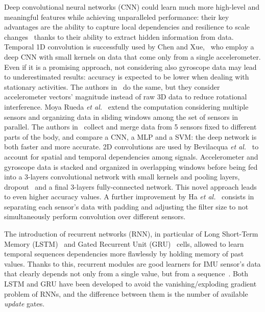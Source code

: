 Deep convolutional neural networks (CNN) could learn much more high-level and meaningful features while achieving unparalleled performance: their key advantages are the ability to capture local dependencies and resilience to scale changes~\cite{Zeng-CNN} thanks to their ability to extract hidden information from data.
Temporal 1D convolution is successfully used by Chen and Xue,~\cite{Chen-SingleAcc} who employ a deep CNN with small kernels on data that come only from a single accelerometer.
Even if it is a promising approach, not considering also gyroscope data may lead to underestimated results: accuracy is expected to be lower when dealing with stationary activities.
The authors in~\cite{Lee-1dCNNandRF} do the same, but they consider accelerometer vectors' magnitude instead of raw 3D data to reduce rotational interference. %
Moya Rueda \textit{et al.}~\cite{Rueda-CNN} extend the computation considering multiple sensors and organizing data in sliding windows among the set of sensors in parallel.
The authors in~\cite{Zebin} collect and merge data from 5 sensors fixed to different parts of the body, and compare a CNN, a MLP and a SVM: the deep network is both faster and more accurate.
2D convolutions are used by Bevilacqua \textit{et al.}~\cite{Bevilacqua-CNN} to account for spatial and temporal dependencies among signals.
Accelerometer and gyroscope data is stacked and organized in overlapping windows before being fed into a 3-layers convolutional network with small kernels and pooling layers, dropout~\cite{Srivastava-Dropout} and a final 3-layers fully-connected network.
This novel approach leads to even higher accuracy values.
A further improvement by Ha \textit{et al.}~\cite{Ha-MultiModalCNN,Ha-MulAccGyro} consists in separating each sensor's data with padding and adjusting the filter size to not simultaneously perform convolution over different sensors.%

The introduction of recurrent networks (RNN), in particular of Long Short-Term Memory (LSTM)~\cite{Hochreiter-LSTM} and Gated Recurrent Unit (GRU)~\cite{Cho-GRU} cells, allowed to learn temporal sequences dependencies more flawlessly by holding memory of past values.
Thanks to this, recurrent modules are good learners for IMU sensor's data that clearly depends not only from a single value, but from a sequence~\cite{Singh-RNN,Pienaar-LSTM}.
Both LSTM and GRU have been developed to avoid the vanishing/exploding gradient problem of RNNs, and the difference between them is the number of available \textit{update} gates.

